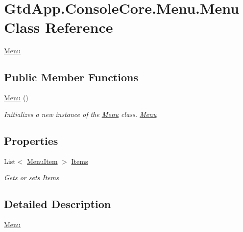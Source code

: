 \hypertarget{class_gtd_app_1_1_console_core_1_1_menu_1_1_menu}{}\section{Gtd\+App.\+Console\+Core.\+Menu.\+Menu Class Reference}
\label{class_gtd_app_1_1_console_core_1_1_menu_1_1_menu}


\mbox{\hyperlink{class_gtd_app_1_1_console_core_1_1_menu_1_1_menu}{Menu}}  


\subsection*{Public Member Functions}
\begin{DoxyCompactItemize}
\item 
\mbox{\hyperlink{class_gtd_app_1_1_console_core_1_1_menu_1_1_menu_a5a00d8068f35986cd40d11f92fcf5efe}{Menu}} ()
\begin{DoxyCompactList}\small\item\em Initializes a new instance of the \mbox{\hyperlink{class_gtd_app_1_1_console_core_1_1_menu_1_1_menu}{Menu}} class. \mbox{\hyperlink{class_gtd_app_1_1_console_core_1_1_menu_1_1_menu}{Menu}} \end{DoxyCompactList}\end{DoxyCompactItemize}
\subsection*{Properties}
\begin{DoxyCompactItemize}
\item 
List$<$ \mbox{\hyperlink{class_gtd_app_1_1_console_core_1_1_menu_1_1_menu_item}{Menu\+Item}} $>$ \mbox{\hyperlink{class_gtd_app_1_1_console_core_1_1_menu_1_1_menu_a3a6c6080f59624a65fd871a80f96d106}{Items}}
\begin{DoxyCompactList}\small\item\em Gets or sets Items \end{DoxyCompactList}\end{DoxyCompactItemize}


\subsection{Detailed Description}
\mbox{\hyperlink{class_gtd_app_1_1_console_core_1_1_menu_1_1_menu}{Menu}} 



